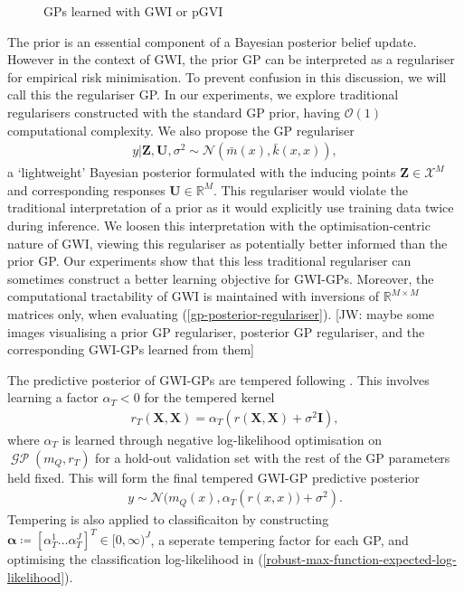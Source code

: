 \documentclass{article}
\newcommand{\jw}[1]{{\color{gray} [JW: #1]}}
\newcommand{\GP}{\operatorname{\mathcal{GP}}}
\numberwithin{equation}{section}
\begin{document}
\begin{figure}[h!]
\begin{minipage}{.49\textwidth}
\end{minipage}%
\label{inducing-points-and-kernel}
\caption{GPs learned with GWI or pGVI}
\end{figure}


The prior is an essential component of a Bayesian posterior belief update.
However in the context of GWI, the prior GP can be interpreted as a regulariser for empirical risk minimisation.
To prevent confusion in this discussion, we will call this the regulariser GP. In our experiments, we explore traditional regularisers constructed with the standard GP prior, having $\mathcal{O}(1)$ computational complexity. We also propose the GP regulariser
\begin{align}
    y \vert \mathbf{Z}, \mathbf{U}, \sigma^2
    \sim \mathcal{N}\left(\bar{m}(x), \bar{k}(x, x)\right),
    \label{gp-posterior-regulariser}
\end{align}
a `lightweight' Bayesian posterior formulated with the inducing points $\mathbf{Z}\in \mathcal{X}^M$ and corresponding responses $\mathbf{U} \in \mathbb{R}^M$.
This regulariser would violate the traditional interpretation of a prior as it would explicitly use training data twice during inference.
We loosen this interpretation with the optimisation-centric nature of GWI, viewing this regulariser as potentially better informed than the prior GP.
Our experiments show that this less traditional regulariser can sometimes construct a better learning objective for GWI-GPs.
Moreover, the computational tractability of GWI is maintained with inversions of $\mathbb{R}^{M\times M}$ matrices only, when evaluating (\ref{gp-posterior-regulariser}).
\jw{maybe some images visualising a prior GP regulariser, posterior GP regulariser, and the corresponding GWI-GPs learned from them}

The predictive posterior of GWI-GPs are tempered following \cite{wild2022generalized}. This involves learning a factor $\alpha_T < 0$ for the tempered kernel
\begin{align}
    r_T(\mathbf{X}, \mathbf{X}) = \alpha_T \left(r(\mathbf{X}, \mathbf{X})+\sigma^2 \mathbf{I}\right),
\end{align}
where $\alpha_T$ is learned through negative log-likelihood optimisation on $\GP(m_Q, r_T)$ for a hold-out validation set with the rest of the GP parameters held fixed. This will form the final tempered GWI-GP predictive posterior
\begin{align}
    y \sim \mathcal{N}(m_Q(x), \alpha_T \left( r(x, x)) + \sigma^2\right).
\end{align}
Tempering is also applied to classificaiton by constructing $\boldsymbol{\alpha} \coloneqq \left[\alpha_T^1 \dots \alpha_T^J\right]^T \in [0, \infty)^J$, a seperate tempering factor for each GP, and optimising the classification log-likelihood in (\ref{robust-max-function-expected-log-likelihood}).
\end{document}
